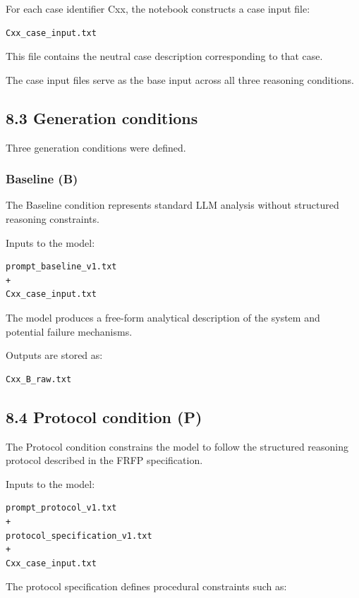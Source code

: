 {For each case identifier Cxx, the notebook constructs a case input file:

\begin{verbatim}
Cxx_case_input.txt
\end{verbatim}

This file contains the neutral case description corresponding to that case.

The case input files serve as the base input across all three reasoning conditions.

\subsection*{8.3 Generation conditions}

Three generation conditions were defined.

\subsubsection*{Baseline (B)}

The Baseline condition represents standard LLM analysis without structured reasoning constraints.

Inputs to the model:

\begin{verbatim}
prompt_baseline_v1.txt
+
Cxx_case_input.txt
\end{verbatim}

The model produces a free-form analytical description of the system and potential failure mechanisms.

Outputs are stored as:

\begin{verbatim}
Cxx_B_raw.txt
\end{verbatim}

\subsection*{8.4 Protocol condition (P)}

The Protocol condition constrains the model to follow the structured reasoning protocol described in the FRFP specification.

Inputs to the model:

\begin{verbatim}
prompt_protocol_v1.txt
+
protocol_specification_v1.txt
+
Cxx_case_input.txt
\end{verbatim}

The protocol specification defines procedural constraints such as:

}
